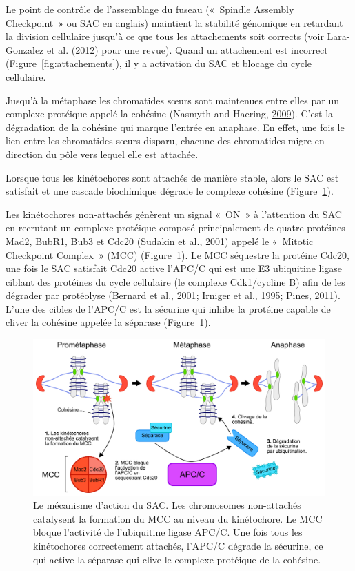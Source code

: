 \documentclass[12pt,a4paper,twoside,openright]{book}
\begin{document}
Le point de contrôle de l'assemblage du fuseau («~Spindle Assembly
Checkpoint~» ou SAC en anglais) maintient la stabilité génomique en
retardant la division cellulaire jusqu'à ce que tous les attachements
soit corrects (voir Lara-Gonzalez et al.
(\protect\hyperlink{ref-Lara-Gonzalez2012}{2012}) pour une revue). Quand
un attachement est incorrect (Figure~\ref{fig:attachements}), il y a
activation du SAC et blocage du cycle cellulaire.

Jusqu'à la métaphase les chromatides sœurs sont maintenues entre elles
par un complexe protéique appelé la cohésine (Nasmyth and Haering,
\protect\hyperlink{ref-Nasmyth2009}{2009}). C'est la dégradation de la
cohésine qui marque l'entrée en anaphase. En effet, une fois le lien
entre les chromatides sœurs disparu, chacune des chromatides migre en
direction du pôle vers lequel elle est attachée.

Lorsque tous les kinétochores sont attachés de manière stable, alors le
SAC est satisfait et une cascade biochimique dégrade le complexe
cohésine (Figure~\ref{fig:sac}).

Les kinétochores non-attachés génèrent un signal «~ON~» à l'attention du
SAC en recrutant un complexe protéique composé principalement de quatre
protéines Mad2, BubR1, Bub3 et Cdc20 (Sudakin et al.,
\protect\hyperlink{ref-Sudakin2001}{2001}) appelé le «~Mitotic
Checkpoint Complex~» (MCC) (Figure~\ref{fig:sac}). Le MCC séquestre la
protéine Cdc20, une fois le SAC satisfait Cdc20 active l'APC/C qui est
une E3 ubiquitine ligase ciblant des protéines du cycle cellulaire (le
complexe Cdk1/cycline B) afin de les dégrader par protéolyse (Bernard et
al., \protect\hyperlink{ref-Bernard2001}{2001}; Irniger et al.,
\protect\hyperlink{ref-Irniger1995}{1995}; Pines,
\protect\hyperlink{ref-Pines2011}{2011}). L'une des cibles de l'APC/C
est la sécurine qui inhibe la protéine capable de cliver la cohésine
appelée la séparase (Figure~\ref{fig:sac}).

\begin{figure}[htbp]
\centering
\includegraphics{figures/intro/sac.png}
\caption[Le mécanisme d'action du SAC]{\label{fig:sac}Le mécanisme
d'action du SAC. Les chromosomes non-attachés catalysent la formation du
MCC au niveau du kinétochore. Le MCC bloque l'activité de l'ubiquitine
ligase APC/C. Une fois tous les kinétochores correctement attachés,
l'APC/C dégrade la sécurine, ce qui active la séparase qui clive le
complexe protéique de la cohésine.}
\end{figure}
\end{document}
